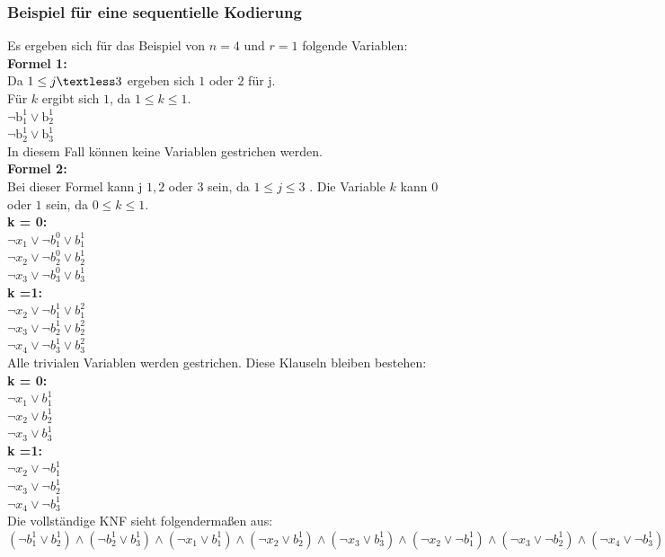 \documentclass[a4,abstract=on]{scrartcl}
\begin{document}
	\subsubsection{Beispiel für eine sequentielle Kodierung}
Es ergeben sich für das Beispiel von $n=4$ und $r=1$ folgende Variablen:\\
\textbf{Formel 1:}\\
Da $1 \leq j \textless 3$ ergeben sich $1$ oder $2$ für j.\\
Für $k$ ergibt sich $1$, da $1 \leq k \leq 1$.\\
$\neg \text{b}_1^1 \vee \text{b}_2^1$\\
$\neg  \text{b}_2^1 \vee \text{b}_3^1$\\
In diesem Fall können keine Variablen gestrichen werden.\\

\textbf{Formel 2:}\\
Bei dieser Formel kann j $1, 2$ oder $3$ sein, da $1 \leq j \leq 3$ . Die Variable $k$ kann $0$ oder $1$ sein, da $0 \leq k \leq 1$.\\
\textbf{k = 0:}\\
$\neg x_1 \vee \neg b_1^0 \vee b_1^1$\\
$\neg x_2 \vee \neg b_2^0 \vee b_2^1$\\
$\neg x_3 \vee \neg b_3^0 \vee b_3^1$\\
\textbf{k =1:}\\
$\neg x_2 \vee \neg b_1^1 \vee b_1^2$\\
$\neg x_3 \vee \neg b_2^1 \vee b_2^2$\\
$\neg x_4 \vee \neg b_3^1 \vee b_3^2$\\

Alle trivialen Variablen werden gestrichen. Diese Klauseln bleiben bestehen:\\
\textbf{k = 0:}\\
$\neg x_1 \vee b_1^1$\\
$\neg x_2 \vee b_2^1$\\
$\neg x_3 \vee b_3^1$\\
\textbf{k =1:}\\
$\neg x_2 \vee \neg b_1^1 $\\
$\neg x_3 \vee \neg b_2^1 $\\
$\neg x_4 \vee \neg b_3^1 $\\

Die vollständige KNF sieht folgendermaßen aus:\\
$(\neg b_1^1 \vee b_2^1) \wedge (\neg b_2^1 \vee b_3^1) \wedge (\neg x_1 \vee b_1^1) \wedge (\neg x_2 \vee b_2^1) \wedge (\neg x_3 \vee b_3^1) \wedge (\neg x_2 \vee \neg b_1^1) \wedge (\neg x_3 \vee \neg b_2^1) \wedge (\neg x_4 \vee \neg b_3^1) $\\
\end{document}

